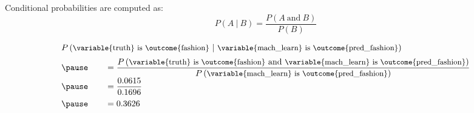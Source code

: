 \documentclass{beamer}
\newcommand{\prob}[1]{P\left({#1}\right)}
\newcommand{\jointprob}[3]{\prob{{#1}~\text{#2}~{#3}}}
\newcommand{\condprob}[2]{\prob{{#1}~|~{#2}}}
\begin{document}
\begin{frame}
\begin{note}
Conditional probabilities are computed as:
\begin{equation*}
\condprob{A}{B} = \dfrac{\jointprob{A}{and}{B}}{\prob{B}}
\end{equation*}
\end{note}\pause

\begin{example}
\begin{equation*}
\begin{array}{l}
\condprob{\text{\small\variable{truth} is \outcome{fashion}}}{\text{\small\variable{mach\_learn} is \outcome{pred\_fashion}}}\\[2mm]\pause
\qquad= \dfrac{\jointprob{\text{\small\variable{truth} is \outcome{fashion}}}{and}{\text{\small\variable{mach\_learn} is \outcome{pred\_fashion}}}}{\prob{\text{\small\variable{mach\_learn} is \outcome{pred\_fashion}}}}\\[2mm]\pause
\qquad=\dfrac{0.0615}{0.1696} \\[3mm]\pause
\qquad= 0.3626
\end{array}
\end{equation*}
\end{example}
\end{frame}
\end{document}
